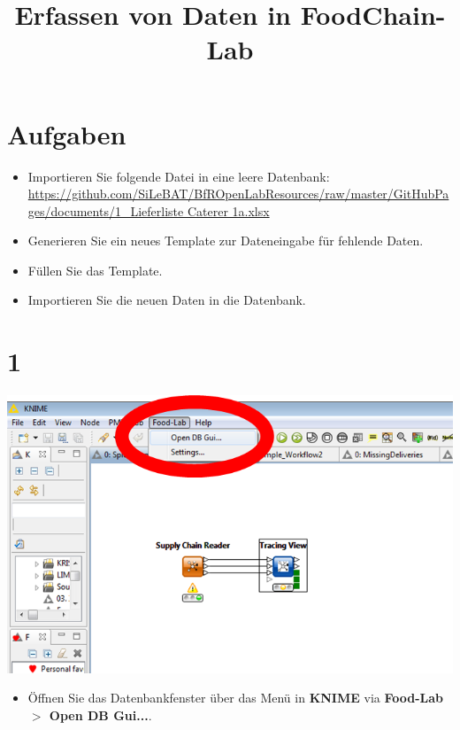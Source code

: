\documentclass{beamer}
\title{Erfassen von Daten in FoodChain-Lab}
\date{}
\begin{document}
\maketitle

\section{Aufgaben}
\begin{frame}
	\begin{itemize}
		\item Importieren Sie folgende Datei in eine leere Datenbank: \url{https://github.com/SiLeBAT/BfROpenLabResources/raw/master/GitHubPages/documents/1_Lieferliste Caterer 1a.xlsx}
		\item Generieren Sie ein neues Template zur Dateneingabe für fehlende Daten.
        \item Füllen Sie das Template.
        \item Importieren Sie die neuen Daten in die Datenbank.
	\end{itemize}
\end{frame}
 
\section{1}
\begin{frame}
	\begin{center}
  		\includegraphics[height=0.6\textheight]{1.png}
	\end{center}
	\begin{itemize}
		\item Öffnen Sie das Datenbankfenster über das Menü in \textbf{KNIME} via \textbf{Food-Lab $>$ Open DB Gui...}.
	\end{itemize}
\end{frame}
\end{document}
